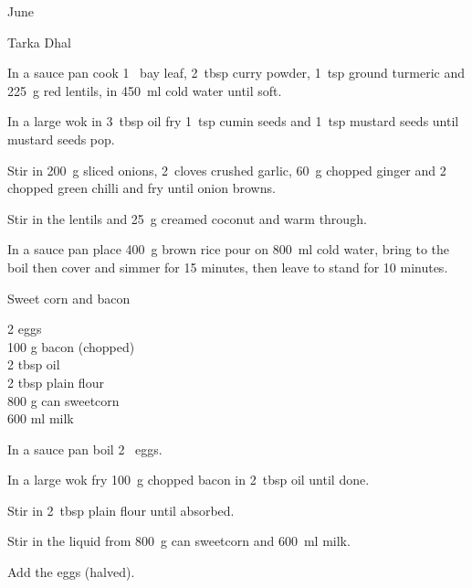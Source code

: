 \begin{menu}{June}
\begin{recipe}{2}{Tarka Dhal}
    \begin{instructions}
    \item 
        In a sauce pan cook
        1~  bay leaf,
        2~tbsp  curry powder,
        1~tsp  ground turmeric
        and
        225~g  red lentils,
        in
        450~ml  cold water
        until soft.
      \item 
        In a large wok in
        3~tbsp  oil
        fry
        1~tsp  cumin seeds
        and
        1~tsp  mustard seeds
        until mustard seeds pop.
      \item 
        Stir in
        200~g sliced onions,
        2~cloves crushed garlic,
        60~g chopped ginger
        and
        2~ chopped green chilli
        and
        fry until onion browns.
      \item 
        Stir in the lentils
        and
        25~g  creamed coconut
        and warm through.
      \item 
      In a
      sauce pan
      place
      400~g  brown rice
      pour on
      800~ml  cold water,
      bring to the boil then cover and simmer for 15 minutes,
      then leave to stand for 10 minutes.
    
    \end{instructions}
    \end{recipe}%
  
    \begin{recipe}{1}{Sweet corn and bacon}%
		\begin{ingredients}
		2  eggs  \\
	100 g bacon (chopped) \\
	2 tbsp oil  \\
	2 tbsp plain flour  \\
	800 g can sweetcorn  \\
	600 ml milk  \\
	
		\end{ingredients}
	
    \begin{instructions}
    \item 
        In a sauce pan boil
        2~  eggs.
      \item 
        In a large wok fry
        100~g chopped bacon
        in
        2~tbsp  oil
        until done.
      \item 
        Stir in
        2~tbsp  plain flour
        until absorbed.
      \item 
        Stir in the liquid from
        800~g  can sweetcorn
        and
        600~ml  milk.
      \item 
        Add the eggs (halved).
      
    \end{instructions}
    \end{recipe}%
  
    \clearpage
    \end{menu}
	
